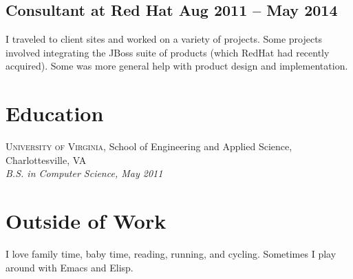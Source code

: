 \documentclass[12pt]{article}
\begin{document}
     
\tag{\LaTeX}

\subsection*{Consultant at Red Hat \hfill Aug 2011 -- May 2014}

I traveled to client sites and worked on a variety of projects. Some projects
involved integrating the JBoss suite of products (which RedHat had recently
acquired). Some was more general help with product design and implementation.

    
  


\section*{Education}

\textsc{University of Virginia}, School of Engineering and Applied Science,
Charlottesville, VA \\
\textit{B.S. in Computer Science, May 2011}


\section*{Outside of Work}

I love family time, baby time, reading, running, and cycling. Sometimes I play
around with Emacs and Elisp.
\end{document}
